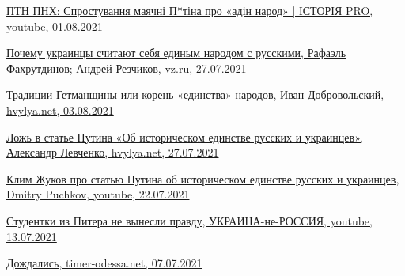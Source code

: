 \href{https://www.youtube.com/watch?v=E2f7VreiQjU}{%
ПТН ПНХ: Спростування маячні П*тіна про «адін народ» | ІСТОРІЯ PRO, youtube, 01.08.2021%
}

\href{https://vz.ru/world/2021/7/27/1111068.html}{%
Почему украинцы считают себя единым народом с русскими, Рафаэль Фахрутдинов; Андрей Резчиков, vz.ru, 27.07.2021%
%
}

\href{https://analytics.hvylya.net/235008-tradicii-getmanshchiny-ili-koren-edinstva-narodov}{%
Традиции Гетманщины или корень «единства» народов, Иван Добровольский, hvylya.net, 03.08.2021%
}

\href{https://analytics.hvylya.net/234552-lozh-v-state-putina-o-istoricheskom-edinstve-russkih-i-ukraincev}{%
Ложь в статье Путина «Об историческом единстве русских и украинцев», Александр Левченко, hvylya.net, 27.07.2021%
}

\href{https://www.youtube.com/watch?v=QnS-8kiyPUw}{%
Клим Жуков про статью Путина об историческом единстве русских и украинцев, Dmitry Puchkov,  youtube, 22.07.2021%
}

\href{https://www.youtube.com/watch?v=Bfu53UbqJf8}{%
Студентки из Питера не вынесли правду, УКРАИНА-не-РОССИЯ, youtube, 13.07.2021%
}

\href{https://timer-odessa.net/minds/dozhdalis_552.html}{%
Дождались, timer-odessa.net, 07.07.2021%
}
